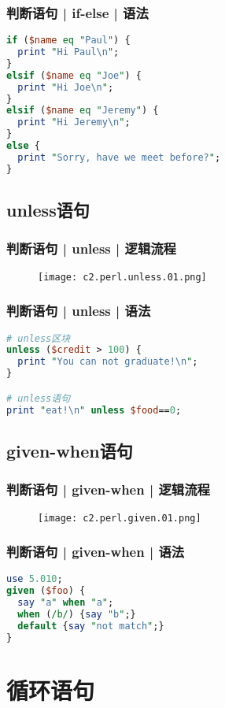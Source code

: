 \begin{frame}[fragile]
  \frametitle{判断语句 | if-else | \alert{语法}}
\begin{lstlisting}[language=Perl]
if ($name eq "Paul") {
  print "Hi Paul\n";
}
elsif ($name eq "Joe") {
  print "Hi Joe\n";
}
elsif ($name eq "Jeremy") {
  print "Hi Jeremy\n";
}
else {
  print "Sorry, have we meet before?";
}
\end{lstlisting}
\end{frame}

\subsection{unless语句}
\begin{frame}
  \frametitle{判断语句 | unless | 逻辑流程}
  \begin{figure}
    \centering
    \texttt{[image: c2.perl.unless.01.png]}
  \end{figure}
\end{frame}

\begin{frame}[fragile]
  \frametitle{判断语句 | unless | \alert{语法}}
\begin{lstlisting}[language=Perl]
# unless区块
unless ($credit > 100) {
  print "You can not graduate!\n";
}

# unless语句
print "eat!\n" unless $food==0;
\end{lstlisting}
\end{frame}

\subsection{given-when语句}
\begin{frame}
  \frametitle{判断语句 | given-when | 逻辑流程}
  \begin{figure}
    \centering
    \texttt{[image: c2.perl.given.01.png]}
  \end{figure}
\end{frame}

\begin{frame}[fragile]
  \frametitle{判断语句 | given-when | 语法}
\begin{lstlisting}[language=Perl]
use 5.010;
given ($foo) {
  say "a" when "a";
  when (/b/) {say "b";}
  default {say "not match";}
}
\end{lstlisting}
\end{frame}

\section{循环语句}
